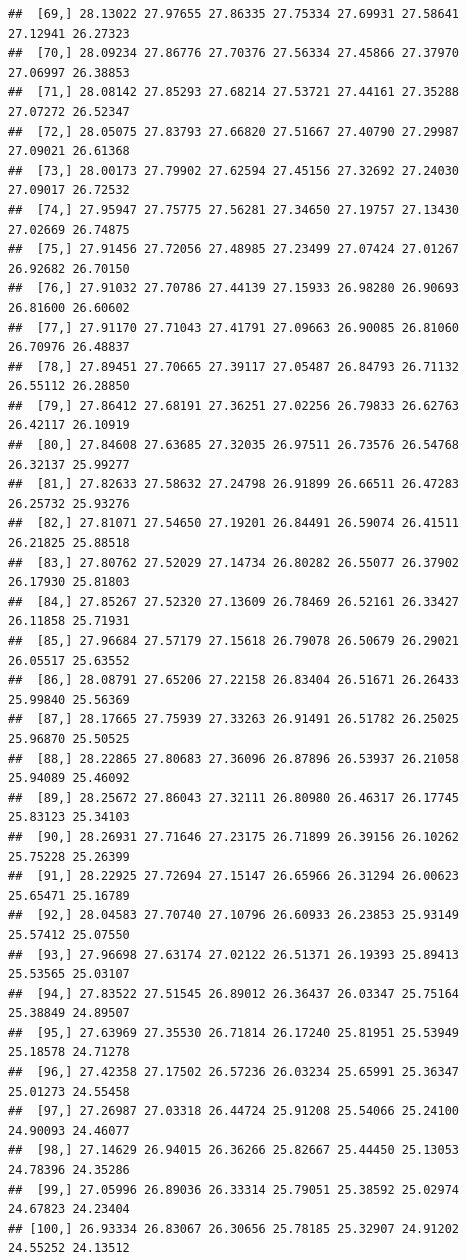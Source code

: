 \documentclass{article}\usepackage[]{graphicx}\usepackage[]{color}
\makeatletter
\newenvironment{kframe}{%
 \def\at@end@of@kframe{}%
 \ifinner\ifhmode%
  \def\at@end@of@kframe{\end{minipage}}%
  \begin{minipage}{\columnwidth}%
 \fi\fi%
 \def\FrameCommand##1{\hskip\@totalleftmargin \hskip-\fboxsep
 \colorbox{shadecolor}{##1}\hskip-\fboxsep
     \hskip-\linewidth \hskip-\@totalleftmargin \hskip\columnwidth}%
 \MakeFramed {\advance\hsize-\width
   \@totalleftmargin\z@ \linewidth\hsize
   \@setminipage}}%
 {\par\unskip\endMakeFramed%
 \at@end@of@kframe}
\newenvironment{knitrout}{}{} %
\makeatother
\begin{document}
\begin{knitrout}
\begin{kframe}
\begin{verbatim}
##  [69,] 28.13022 27.97655 27.86335 27.75334 27.69931 27.58641 27.12941 26.27323
##  [70,] 28.09234 27.86776 27.70376 27.56334 27.45866 27.37970 27.06997 26.38853
##  [71,] 28.08142 27.85293 27.68214 27.53721 27.44161 27.35288 27.07272 26.52347
##  [72,] 28.05075 27.83793 27.66820 27.51667 27.40790 27.29987 27.09021 26.61368
##  [73,] 28.00173 27.79902 27.62594 27.45156 27.32692 27.24030 27.09017 26.72532
##  [74,] 27.95947 27.75775 27.56281 27.34650 27.19757 27.13430 27.02669 26.74875
##  [75,] 27.91456 27.72056 27.48985 27.23499 27.07424 27.01267 26.92682 26.70150
##  [76,] 27.91032 27.70786 27.44139 27.15933 26.98280 26.90693 26.81600 26.60602
##  [77,] 27.91170 27.71043 27.41791 27.09663 26.90085 26.81060 26.70976 26.48837
##  [78,] 27.89451 27.70665 27.39117 27.05487 26.84793 26.71132 26.55112 26.28850
##  [79,] 27.86412 27.68191 27.36251 27.02256 26.79833 26.62763 26.42117 26.10919
##  [80,] 27.84608 27.63685 27.32035 26.97511 26.73576 26.54768 26.32137 25.99277
##  [81,] 27.82633 27.58632 27.24798 26.91899 26.66511 26.47283 26.25732 25.93276
##  [82,] 27.81071 27.54650 27.19201 26.84491 26.59074 26.41511 26.21825 25.88518
##  [83,] 27.80762 27.52029 27.14734 26.80282 26.55077 26.37902 26.17930 25.81803
##  [84,] 27.85267 27.52320 27.13609 26.78469 26.52161 26.33427 26.11858 25.71931
##  [85,] 27.96684 27.57179 27.15618 26.79078 26.50679 26.29021 26.05517 25.63552
##  [86,] 28.08791 27.65206 27.22158 26.83404 26.51671 26.26433 25.99840 25.56369
##  [87,] 28.17665 27.75939 27.33263 26.91491 26.51782 26.25025 25.96870 25.50525
##  [88,] 28.22865 27.80683 27.36096 26.87896 26.53937 26.21058 25.94089 25.46092
##  [89,] 28.25672 27.86043 27.32111 26.80980 26.46317 26.17745 25.83123 25.34103
##  [90,] 28.26931 27.71646 27.23175 26.71899 26.39156 26.10262 25.75228 25.26399
##  [91,] 28.22925 27.72694 27.15147 26.65966 26.31294 26.00623 25.65471 25.16789
##  [92,] 28.04583 27.70740 27.10796 26.60933 26.23853 25.93149 25.57412 25.07550
##  [93,] 27.96698 27.63174 27.02122 26.51371 26.19393 25.89413 25.53565 25.03107
##  [94,] 27.83522 27.51545 26.89012 26.36437 26.03347 25.75164 25.38849 24.89507
##  [95,] 27.63969 27.35530 26.71814 26.17240 25.81951 25.53949 25.18578 24.71278
##  [96,] 27.42358 27.17502 26.57236 26.03234 25.65991 25.36347 25.01273 24.55458
##  [97,] 27.26987 27.03318 26.44724 25.91208 25.54066 25.24100 24.90093 24.46077
##  [98,] 27.14629 26.94015 26.36266 25.82667 25.44450 25.13053 24.78396 24.35286
##  [99,] 27.05996 26.89036 26.33314 25.79051 25.38592 25.02974 24.67823 24.23404
## [100,] 26.93334 26.83067 26.30656 25.78185 25.32907 24.91202 24.55252 24.13512

\end{verbatim}
\end{kframe}
\end{knitrout}
\end{document}
